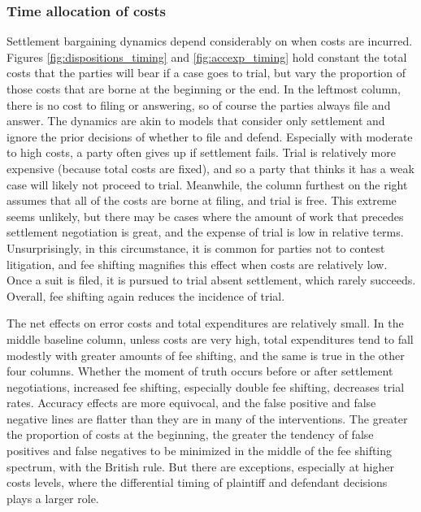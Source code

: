 \documentclass{article}
\begin{document}
\subsubsection{Time allocation of costs}

Settlement bargaining dynamics depend considerably on when costs are incurred. Figures \ref{fig:dispositions_timing} and \ref{fig:accexp_timing} hold constant the total costs that the parties will bear if a case goes to trial, but vary the proportion of those costs that are borne at the beginning or the end. In the leftmost column, there is no cost to filing or answering, so of course the parties always file and answer. The dynamics are akin to models that consider only settlement and ignore the prior decisions of whether to file and defend. Especially with moderate to high costs, a party often gives up if settlement fails. Trial is relatively more expensive (because total costs are fixed), and so a party that thinks it has a weak case will likely not proceed to trial. Meanwhile, the column furthest on the right assumes that all of the costs are borne at filing, and trial is free. This extreme seems unlikely, but there may be cases where the amount of work that precedes settlement negotiation is great, and the expense of trial is low in relative terms. Unsurprisingly, in this circumstance, it is common for parties not to contest litigation, and fee shifting magnifies this effect when costs are relatively low. Once a suit is filed, it is pursued to trial absent settlement, which rarely succeeds. Overall, fee shifting again reduces the incidence of trial.

The net effects on error costs and total expenditures are relatively small. In the middle baseline column, unless costs are very high, total expenditures tend to fall modestly with greater amounts of fee shifting, and the same is true in the other four columns. Whether the moment of truth occurs before or after settlement negotiations, increased fee shifting, especially double fee shifting, decreases trial rates. Accuracy effects are more equivocal, and the false positive and false negative lines are flatter than they are in many of the interventions. The greater the proportion of costs at the beginning, the greater the tendency of false positives and false negatives to be minimized in the middle of the fee shifting spectrum, with the British rule. But there are exceptions, especially at higher costs levels, where the differential timing of plaintiff and defendant decisions plays a larger role. 
\end{document}
